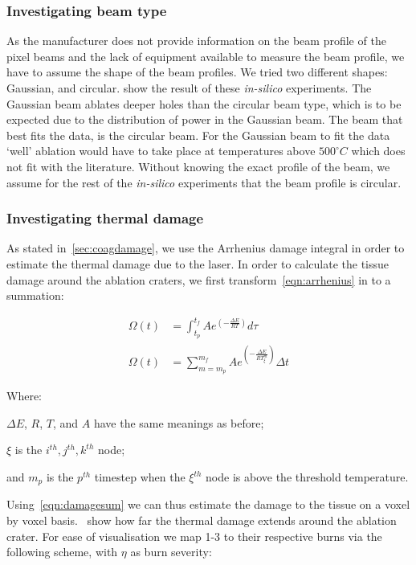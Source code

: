 \subsubsection*{Investigating beam type}

As the manufacturer does not provide information on the beam profile of the pixel beams and the lack of equipment available to measure the beam profile, we have to assume the shape of the beam profiles. We tried two different shapes: Gaussian, and circular.  show the result of these \textit{in-silico} experiments. The Gaussian beam ablates deeper holes than the circular beam type, which is to be expected due to the distribution of power in the Gaussian beam. The beam that best fits the data, is the circular beam. For the Gaussian beam to fit the data `well' ablation would have to take place at temperatures above $500^{\circ}C$ which does not fit with the literature. Without knowing the exact profile of the beam, we assume for the rest of the \textit{in-silico} experiments that the beam profile is circular.

\subsubsection*{Investigating thermal damage} 

As stated in~\cref{sec:coagdamage}, we use the Arrhenius damage integral in order to estimate the thermal damage due to the laser. In order to calculate the tissue damage around the ablation craters, we first transform~\cref{eqn:arrhenius} in to a summation:

\begin{align}
\Omega(t) &= \int^{t_{f}}_{t_p} Ae^{(-\tfrac{\Delta E}{RT})}d\tau \\
\Omega(t) &= \sum_{m=m_p}^{m_f} Ae^{(-\tfrac{\Delta E}{RT_{\xi}^{m}})}\Delta t\label{eqn:damagesum}
\end{align}
 
\noindent Where: 
	
	\indent $\Delta E$, $R$, $T$, and $A$ have the same meanings as before;
	
	\indent $\xi$ is the $i^{th}, j^{th}, k^{th}$ node;
	
	\indent and $m_p$ is the $p^{th}$ timestep when the $\xi^{th}$ node is above the threshold temperature.

	\medskip
	
	Using~\cref{eqn:damagesum} we can thus estimate the damage to the tissue on a voxel by voxel basis.~ show how far the thermal damage extends around the ablation crater. For ease of visualisation we map 1-3 to their respective burns via the following scheme, with $\eta$ as burn severity:
	
